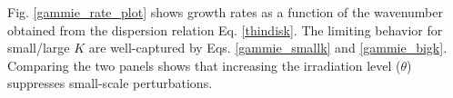 

Fig. \ref{gammie_rate_plot} shows growth rates as a function of the
wavenumber obtained from the dispersion relation 
Eq. \ref{thindisk}. The limiting behavior for small/large $K$ are
well-captured by Eqs. \ref{gammie_smallk} and
\ref{gammie_bigk}. Comparing the two panels 
shows that increasing the
irradiation level ($\theta$) suppresses small-scale
perturbations. %


